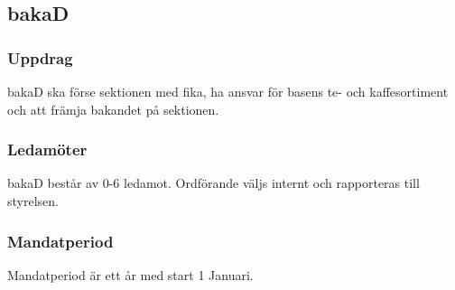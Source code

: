 \subsection{bakaD}
\subsubsection{Uppdrag}
bakaD ska förse sektionen med fika, ha ansvar för basens te- och kaffesortiment och att främja bakandet på sektionen.
\subsubsection{Ledamöter}
bakaD består av 0-6 ledamot. Ordförande väljs internt och rapporteras till styrelsen.
\subsubsection{Mandatperiod}
Mandatperiod är ett år med start 1 Januari.
\newpage
